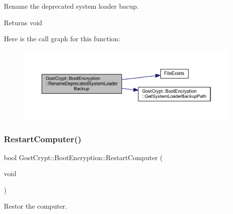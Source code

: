Rename the deprecated system loader bacup. 

\begin{DoxyReturn}{Returns}
void 
\end{DoxyReturn}
Here is the call graph for this function\+:
\nopagebreak
\begin{figure}[H]
\begin{center}
\leavevmode
\includegraphics[width=350pt]{class_gost_crypt_1_1_boot_encryption_a2cf9147810cf18732e40ccbae474b7be_cgraph}
\end{center}
\end{figure}
\mbox{\label{class_gost_crypt_1_1_boot_encryption_aa8a362642702d24c487f62cd4a109300}} 
\subsubsection{\texorpdfstring{Restart\+Computer()}{RestartComputer()}}
{\footnotesize\ttfamily bool Gost\+Crypt\+::\+Boot\+Encryption\+::\+Restart\+Computer (\begin{DoxyParamCaption}\item[{void}]{ }\end{DoxyParamCaption})}



Restor the computer. 

